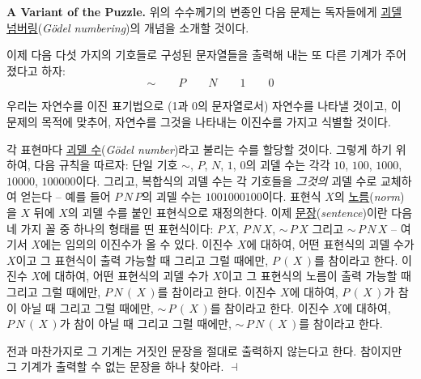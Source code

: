 \documentclass[12pt]{paper}
\newenvironment{context}[1][]
{ \noindent \textbf{{#1}.} }
{ \hfill $ \dashv $ }
\begin{document}
\begin{context}[A Variant of the Puzzle]
위의 수수께기의 변종인 다음 문제는 독자들에게 \underline{괴델 넘버링}(\textit{G\"odel numbering})의 개념을 소개할 것이다.

이제 다음 다섯 가지의 기호들로 구성된 문자열들을 출력해 내는 또 다른 기계가 주어졌다고 하자:
$$ \sim \qquad P \qquad N \qquad 1 \qquad 0 $$

우리는 자연수를 이진 표기법으로 (1과 0의 문자열로서) 자연수를 나타낼 것이고,
이 문제의 목적에 맞추어, 자연수를 그것을 나타내는 이진수를 가지고 식별할 것이다.

각 표현마다 \underline{괴델 수}(\textit{G\"odel number})라고 불리는 수를 할당할 것이다.
그렇게 하기 위하여, 다음 규칙을 따르자:
단일 기호 $\sim$, $P$, $N$, $1$, $0$의 괴델 수는 각각 $10$, $100$, $1000$, $10000$, $100000$이다.
그리고, 복합식의 괴델 수는 각 기호들을 \textit{그것의} 괴델 수로 교체하여 얻는다 --
예를 들어 $P \, N \, P$의 괴델 수는 $1001000100$이다.
표현식 $X$의 \underline{노름}(\textit{norm})을 $X$ 뒤에 $X$의 괴델 수를 붙인 표현식으로 재정의한다.
이제 \underline{문장}(\textit{sentence})이란 다음 네 가지 꼴 중 하나의 형태를 띤 표현식이다:
$P \, X$, $P \, N \, X$, $\sim \, P \, X$ 그리고 $\sim \, P \, N \, X$ --
여기서 $X$에는 임의의 이진수가 올 수 있다.
이진수 $X$에 대하여, 어떤 표현식의 괴델 수가 $X$이고 그 표현식이 출력 가능할 때 그리고 그럴 때에만,
$P \, \left( \, X \, \right)$를 참이라고 한다.
이진수 $X$에 대하여, 어떤 표현식의 괴델 수가 $X$이고 그 표현식의 노름이 출력 가능할 때 그리고 그럴 때에만,
$P \, N \, \left( \, X \, \right)$를 참이라고 한다.
이진수 $X$에 대하여, $P \, \left( \, X \, \right)$가 참이 아닐 때 그리고 그럴 때에만,
$\sim \, P \, \left( \, X \, \right)$를 참이라고 한다.
이진수 $X$에 대하여, $P \, N \, \left( \, X \, \right)$가 참이 아닐 때 그리고 그럴 때에만,
$\sim \, P \, N \, \left( \, X \, \right)$를 참이라고 한다.

전과 마찬가지로 그 기계는 거짓인 문장을 절대로 출력하지 않는다고 한다.
참이지만 그 기계가 출력할 수 없는 문장을 하나 찾아라.
\end{context}
\end{document}
